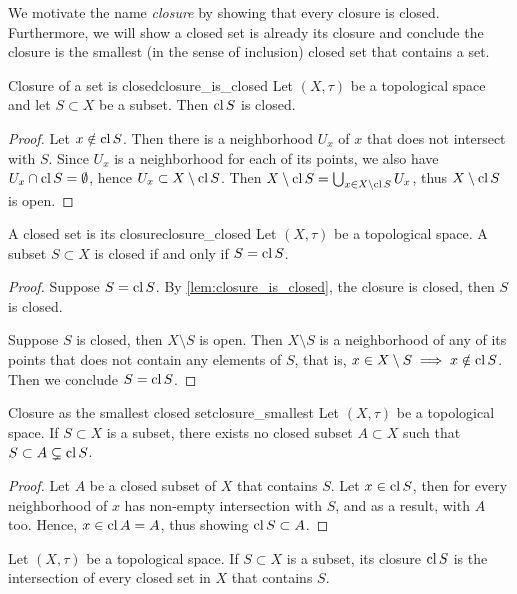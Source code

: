 We motivate the name \emph{closure} by showing that every closure is closed. Furthermore, we will show a closed set is already its closure and conclude the closure is the smallest (in the sense of inclusion) closed set that contains a set.
\begin{lemma}{Closure of a set is closed}{closure_is_closed}
    Let \((X, \tau)\) be a topological space and let \(S\subset X\) be a subset. Then \(\operatorname{cl} S\) is closed.
\end{lemma}
\begin{proof}
    Let \(x \notin \operatorname{cl} S\). Then there is a neighborhood \(U_x\) of \(x\) that does not intersect with \(S\). Since \(U_x\) is a neighborhood for each of its points, we also have \(U_x \cap \operatorname{cl} S = \emptyset\), hence \(U_x \subset X \setminus \operatorname{cl} S\). Then \(X \setminus \operatorname{cl}{S} = \bigcup_{x \in X\setminus \operatorname{cl} S} U_x\), thus \(X \setminus \operatorname{cl}{S}\) is open.
\end{proof}
\begin{lemma}{A closed set is its closure}{closure_closed}
    Let \((X, \tau)\) be a topological space. A subset \(S \subset X\) is closed if and only if \(S = \operatorname{cl} S\).
\end{lemma}
\begin{proof}
    Suppose \(S = \operatorname{cl} S\). By \cref{lem:closure_is_closed}, the closure is closed, then \(S\) is closed.

    Suppose \(S\) is closed, then \(X \setminus S\) is open. Then \(X \setminus S\) is a neighborhood of any of its points that does not contain any elements of \(S\), that is, \(x \in X\setminus S \implies x \notin \operatorname{cl} S\). Then we conclude \(S = \operatorname{cl} S\).
\end{proof}
\begin{theorem}{Closure as the smallest closed set}{closure_smallest}
    Let \((X, \tau)\) be a topological space. If \(S\subset X\) is a subset, there exists no closed subset \(A \subset X\) such that \(S \subset A \subsetneq \operatorname{cl} S\).
\end{theorem}
\begin{proof}
    Let \(A\) be a closed subset of \(X\) that contains \(S\). Let \(x \in \operatorname{cl}{S}\), then for every neighborhood of \(x\) has non-empty intersection with \(S\), and as a result, with \(A\) too. Hence, \(x \in \operatorname{cl}{A} = A\), thus showing \(\operatorname{cl}{S} \subset A\).
\end{proof}
\begin{corollary}
    Let \((X, \tau)\) be a topological space. If \(S \subset X\) is a subset, its closure \(\operatorname{cl}{S}\) is the intersection of every closed set in \(X\) that contains \(S\).
\end{corollary}
